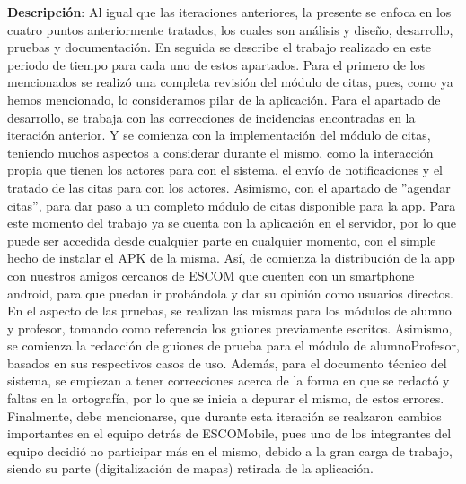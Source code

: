 \noindent
\textbf{Descripción}: Al igual que las iteraciones anteriores, la presente se enfoca en los cuatro puntos anteriormente tratados, los cuales son análisis y diseño, desarrollo, pruebas y documentación. En seguida se describe el trabajo realizado en este periodo de tiempo para cada uno de estos apartados. 
\newline
\newline
Para el primero de los mencionados se realizó una completa revisión del módulo de citas, pues, como ya hemos mencionado, lo consideramos pilar de la aplicación. 
\newline
\newline
Para el apartado de desarrollo, se trabaja con las correcciones de incidencias encontradas en la iteración anterior. Y se comienza con la implementación del módulo de citas, teniendo muchos aspectos a considerar durante el mismo, como la interacción propia que tienen los actores para con el sistema, el envío de notificaciones y el tratado de las citas para con los actores. Asimismo, con el apartado de ''agendar citas'', para dar paso a un completo módulo de citas disponible para la app. 
\newline
Para este momento del trabajo ya se cuenta con la aplicación en el servidor, por lo que puede ser accedida desde cualquier parte en cualquier momento, con el simple hecho de instalar el APK de la misma. Así, de comienza la distribución de la app con nuestros amigos cercanos de ESCOM que cuenten con un smartphone android, para que puedan ir probándola y dar su opinión como usuarios directos. 
\newline
\newline
En el aspecto de las pruebas, se realizan las mismas para los módulos de alumno y profesor, tomando como referencia los guiones previamente escritos. Asimismo, se comienza la redacción de guiones de prueba para el módulo de alumnoProfesor, basados en sus respectivos casos de uso. 
\newline
Además, para el documento técnico del sistema, se empiezan a tener correcciones acerca de la forma en que se redactó y faltas en la ortografía, por lo que se inicia a depurar el mismo, de estos errores.
\newline
\newline
Finalmente, debe mencionarse, que durante esta iteración se realzaron cambios importantes en el equipo detrás de ESCOMobile, pues uno de los integrantes del equipo decidió no participar más en el mismo, debido a la gran carga de trabajo, siendo su parte (digitalización de mapas) retirada de la aplicación. 
